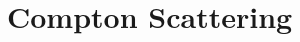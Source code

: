 \documentclass{article}
\title{}
\date{}
\newcommand{\<}{\langle}
\renewcommand{\>}{\rangle}
\begin{document}
\maketitle

\section{Compton Scattering}
\end{document}

